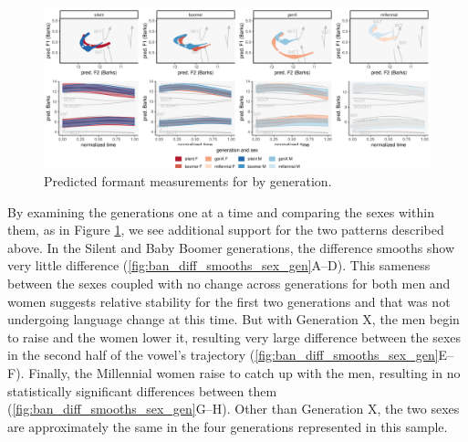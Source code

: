 \begin{figure}[p]
	\centering
	\includegraphics[angle = 90, origin = c, height = \textwidth]{Figures/BAN/BAN_sex_panel_plot_wide.pdf}
	\caption[Predicted formant measurements for \ban by generation.]{Predicted formant measurements for \ban by generation.}
	\label{fig:BAN_sex_panel_plot_wide}
\end{figure}

By examining the generations one at a time and comparing the sexes within them, as in Figure \ref{fig:BAN_sex_panel_plot_wide}, we see additional support for the two patterns described above. In the Silent and Baby Boomer generations, the difference smooths show very little difference (\ref{fig:ban_diff_smooths_sex_gen}A--D). This sameness between the sexes coupled with no change across generations for both men and women suggests relative stability for the first two generations and that \ban was not undergoing language change at this time. But with Generation X, the men begin to raise \ban and the women lower it, resulting very large difference between the sexes in the second half of the vowel's trajectory (\ref{fig:ban_diff_smooths_sex_gen}E--F). Finally, the Millennial women raise \ban to catch up with the men, resulting in no statistically significant differences between them (\ref{fig:ban_diff_smooths_sex_gen}G--H). Other than Generation X, the two sexes are approximately the same in the four generations represented in this sample.

